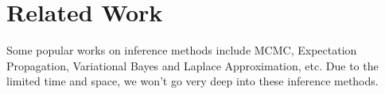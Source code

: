 \section{Related Work} \label{sec:related}



Some popular works on inference methods include
MCMC\cite{gamerman1997sampling},
Expectation Propagation\cite{minka2001expectation},
Variational Bayes\cite{palmer2006variational,nickisch2009convex}
and Laplace Approximation\cite{tierney1986accurate},
etc.
Due to the limited time and space, we won't go very deep into these inference methods.